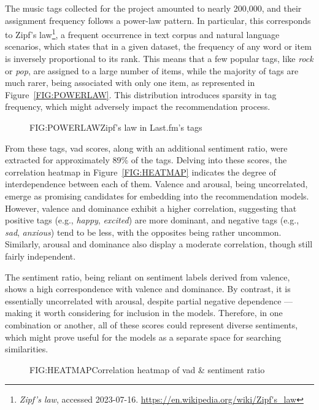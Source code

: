 The music tags collected for the project amounted to nearly 200,000, and their assignment frequency follows a power-law pattern. In particular, this corresponds to Zipf's law\footnote[1]{\emph{Zipf's law}, accessed 2023{-}07{-}16. \url{https://en.wikipedia.org/wiki/Zipf's_law}}, a frequent occurrence in text corpus and natural language scenarios, which states that in a given dataset, the frequency of any word or item is inversely proportional to its rank. This means that a few popular tags, like \emph{rock} or \emph{pop}, are assigned to a large number of items, while the majority of tags are much rarer, being associated with only one item, as represented in Figure~\ref{FIG:POWERLAW}. This distribution introduces sparsity in tag frequency, which might adversely impact the recommendation process.

\begin{figure}[Zipf's law in Last.fm's tags]{FIG:POWERLAW}{Zipf's law in Last.fm's tags}
\end{figure}

From these tags, \acs{vad} scores, along with an additional sentiment ratio, were extracted for approximately 89\% of the tags. Delving into these scores, the correlation heatmap in Figure~\ref{FIG:HEATMAP} indicates the degree of interdependence between each of them. Valence and arousal, being uncorrelated, emerge as promising candidates for embedding into the recommendation models. However, valence and dominance exhibit a higher correlation, suggesting that positive tags (e.g., \emph{happy}, \emph{excited}) are more dominant, and negative tags (e.g., \emph{sad}, \emph{anxious}) tend to be less, with the opposites being rather uncommon. Similarly, arousal and dominance also display a moderate correlation, though still fairly independent.

The sentiment ratio, being reliant on sentiment labels derived from valence, shows a high correspondence with valence and dominance. By contrast, it is essentially uncorrelated with arousal, despite partial negative dependence --- making it worth considering for inclusion in the models. Therefore, in one combination or another, all of these scores could represent diverse sentiments, which might prove useful for the models as a separate space for searching similarities.

\begin{figure}[Correlation heatmap of sentiment attributes]{FIG:HEATMAP}{Correlation heatmap of \acs{vad} \& sentiment ratio}
\end{figure}

